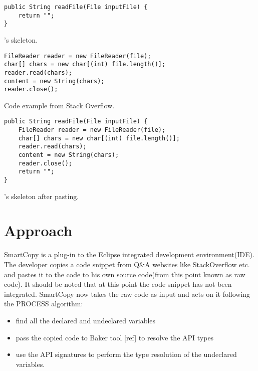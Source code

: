\begin{center}
\begin{code}
\begin{lstlisting}[style=javastyle]
public String readFile(File inputFile) {
	return "";
}
\end{lstlisting}
\vspace{\spacebeforecaption{}}
\caption{\label{cd:before}\developer{}'s skeleton.}
\end{code}
\begin{code}
\begin{lstlisting}[style=javastyle]
FileReader reader = new FileReader(file);
char[] chars = new char[(int) file.length()];
reader.read(chars);
content = new String(chars);
reader.close();
\end{lstlisting}
\vspace{\spacebeforecaption{}}
\caption{\label{cd:example}Code example from Stack Overflow.}
\end{code}
\begin{code}
\begin{lstlisting}[style=javastyle]
public String readFile(File inputFile) {
	FileReader reader = new FileReader(file);
	char[] chars = new char[(int) file.length()];
	reader.read(chars);
	content = new String(chars);
	reader.close();
	return "";
}
\end{lstlisting}
\vspace{\spacebeforecaption{}}
\caption{\label{cd:after}\developer{}'s skeleton after pasting.}
\end{code}
\end{center}


\section*{Approach}

SmartCopy is a plug-in to the Eclipse integrated development environment(IDE). 
The developer copies a code snippet from Q\&A websites like StackOverflow etc. and pastes it to the code to his own source code(from this point known as raw code). 
It should be noted that at this point the code snippet has not been integrated.  
SmartCopy now takes the raw code as input and acts on it following the PROCESS algorithm:
\begin{itemize}
\item find all the declared and undeclared variables 
\item pass the copied code to Baker tool [ref] to resolve the API types
\item use the API signatures to perform the type resolution of the undeclared variables.
\end{itemize}

